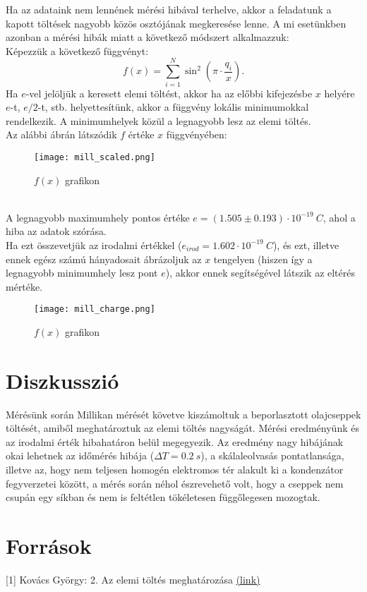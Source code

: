 \documentclass[a4paper]{article}
\begin{document}
Ha az adataink nem lennének mérési hibával terhelve, akkor a feladatunk a kapott töltések nagyobb közös osztójának megkeresése lenne. A mi esetünkben azonban a mérési hibák miatt a következő módszert alkalmazzuk:\\
Képezzük a következő függvényt:
\begin{equation}
f(x)=\sum_{i=1}^N \sin^2\left(\pi\cdot\frac{q_i}{x}\right).
\end{equation}
Ha $e$-vel jelöljük a keresett elemi töltést, akkor ha az előbbi kifejezésbe $x$ helyére $e$-t, $e/2$-t, stb. helyettesítünk, akkor a függvény lokális minimumokkal rendelkezik. A minimumhelyek közül a legnagyobb lesz az elemi töltés.\\
Az alábbi ábrán látszódik $f$ értéke $x$ függvényében:
\begin{figure}[h!]\centering
	\caption{$f(x)$ grafikon}
	\texttt{[image: mill\_scaled.png]}
\end{figure}\\
A legnagyobb maximumhely pontos értéke $e=(1.505\pm0.193)\cdot 10^{-19}\ C$, ahol a hiba az adatok szórása.\\
Ha ezt összevetjük az irodalmi értékkel ($e_{irod}=1.602\cdot 10^{-19}\ C$), és ezt, illetve ennek egész számú hányadosait ábrázoljuk az $x$ tengelyen (hiszen így a legnagyobb minimumhely lesz pont $e$), akkor ennek segítségével látszik az eltérés mértéke.
\begin{figure}[h!]\centering
	\caption{$f(x)$ grafikon}
	\texttt{[image: mill\_charge.png]}
\end{figure}

\section{Diszkusszió}
Mérésünk során Millikan mérését követve kiszámoltuk a beporlasztott olajcseppek töltését, amiből meghatároztuk az elemi töltés nagyságát. Mérési eredményünk és az irodalmi érték hibahatáron belül megegyezik. Az eredmény nagy hibájának okai lehetnek az időmérés hibája ($\Delta T=0.2\ s$), a skálaleolvasás pontatlansága, illetve az, hogy nem teljesen homogén elektromos tér alakult ki a kondenzátor fegyverzetei között, a mérés során néhol észrevehető volt, hogy a cseppek nem csupán egy síkban és nem is feltétlen tökéletesen függőlegesen mozogtak.

\section{Források}
[1] Kovács György: 2. Az elemi töltés meghatározása
\href{http://wigner.elte.hu/koltai/labor/parts/modern2.pdf}{(link)}
\end{document}
